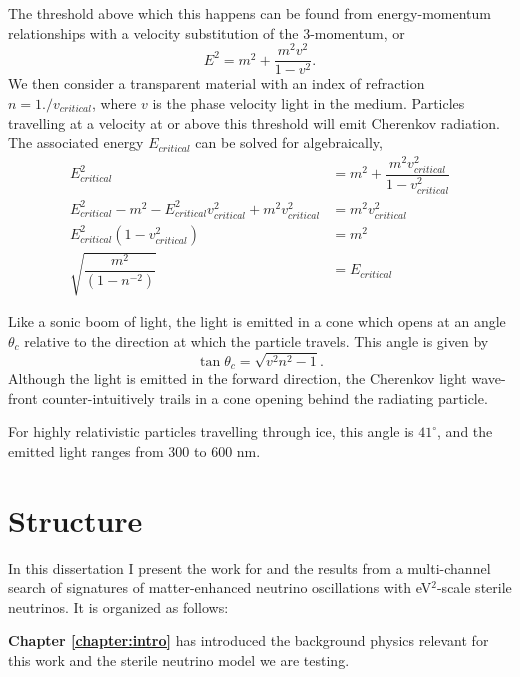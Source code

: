 \documentclass[main.tex]{subfiles}
\begin{document}
The threshold above which this happens can be found from energy-momentum relationships with a velocity substitution of the 3-momentum, or 
\begin{equation}
    E^{2} = m^{2} + \dfrac{m^{2}v^{2}}{1-v^{2}}.
\end{equation}
We then consider a transparent material with an index of refraction $n = 1./v_{critical}$, where $v$ is the phase velocity light in the medium. 
Particles travelling at a velocity at or above this threshold will emit Cherenkov radiation. 
The associated energy $E_{critical}$ can be solved for algebraically,
\begin{align}
        E^{2}_{critical} &= m^{2} + \dfrac{m^{2}v_{critical}^{2}}{1-v_{critical}^{2}} \\
        E^{2}_{critical}  - m^{2} - E^{2}_{critical}v_{critical}^{2}  + m^{2}v_{critical}^{2} &= m^{2}v_{critical}^{2} \\
        E^{2}_{critical}\left(1  -v_{critical}^{2}\right) &=  m^{2} \\
        \sqrt{\dfrac{m^{2}}{\left(1  -n^{-2}\right)}} &= E_{critical} 
\end{align}

Like a sonic boom of light, the light is emitted in a cone which opens at an angle $\theta_{c}$ relative to the direction at which the particle travels. 
This angle is given by
\begin{equation}
\tan\theta_{c} = \sqrt{v^{2}n^{2} - 1} .
\end{equation}
Although the light is emitted in the forward direction, the Cherenkov light wave-front counter-intuitively trails in a cone opening behind the radiating particle. 

For highly relativistic particles travelling through ice, this angle is $41^{\circ}$, and the emitted light ranges from 300 to 600 nm. 

\section{Structure}

In this dissertation I present the work for and the results from a multi-channel search of signatures of matter-enhanced neutrino oscillations with eV$^{2}$-scale sterile neutrinos. 
It is organized as follows:

\textbf{Chapter \ref{chapter:intro}} has introduced the background physics relevant for this work and the sterile neutrino model we are testing.
\end{document}
